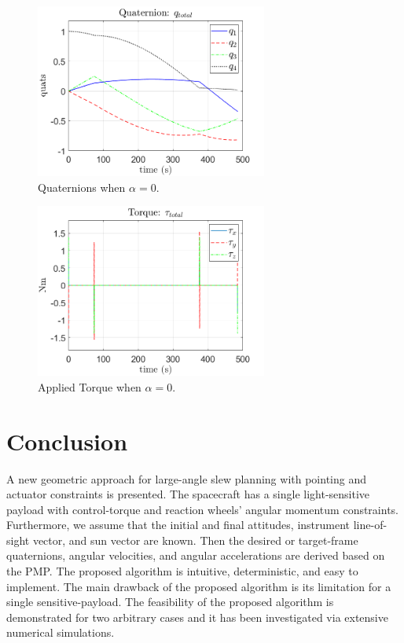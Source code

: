 \documentclass[letterpaper, preprint, paper,11pt]{AAS}	%
\begin{document}
\begin{multicols}{2}
	\begin{figure}[H]
		\begin{center}
			\includegraphics[width=3in]{figures/alpha0/quats.png}
		\end{center}
		\caption{Quaternions when $\alpha=0$.}
		\label{fig:quats_phi_total_alpha0}
	\end{figure}
	\columnbreak
	\begin{figure}[H]
		\begin{center}
			\includegraphics[width=3in]{figures/alpha0/torque.png}
		\end{center}
		\caption{Applied Torque when $\alpha=0$.}
		\label{fig:torque_total_alpha0}
	\end{figure}
\end{multicols}
			
			
	\section{Conclusion}
	 A new geometric approach for large-angle slew planning with pointing and actuator constraints is presented. The spacecraft has a single light-sensitive payload with control-torque and reaction wheels' angular momentum constraints. Furthermore, we assume that the initial and final attitudes, instrument line-of-sight vector, and sun vector are known. Then the desired or target-frame quaternions, angular velocities, and angular accelerations are derived based on the PMP.  The proposed algorithm is intuitive, deterministic, and easy to implement. The main drawback of the proposed algorithm is its limitation for a single sensitive-payload. The feasibility of the proposed algorithm is demonstrated for two arbitrary cases and it has been investigated via extensive numerical simulations.
\end{document}
